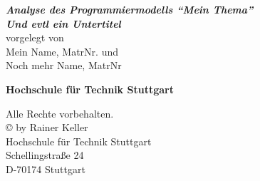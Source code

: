 \vspace*{5mm}%
\thispagestyle{empty}%
\hspace{5mm}%
\begin{minipage}[t]{140mm}
  \flushleft
  \vspace{10mm}%
  \noindent%
  {\sffamily\slshape\bfseries\Large%
    Analyse des Programmiermodells "`Mein Thema"' \\
    Und evtl ein Untertitel\\
  }
  \vspace*{4ex}%
  vorgelegt von
  \\[2ex]
  Mein Name, MatrNr. und\\%
  Noch mehr Name, MatrNr\\%

  \vspace*{10cm}
  \begin{center}
    {\bf Hochschule für Technik Stuttgart}\\[2ex]
    {\bf \the\year}
  \end{center}
\end{minipage}
\clearpage


\thispagestyle{empty}
\rule{0pt}{0pt}
\vfill
{\footnotesize%
  \noindent%
  Alle Rechte vorbehalten.\\[1.5ex]
  \copyright \the\year{} by Rainer Keller\\[1.5ex]
  Hochschule für Technik Stuttgart\\
  Schellingstraße 24\\
  D-70174 Stuttgart%
}
\clearpage


